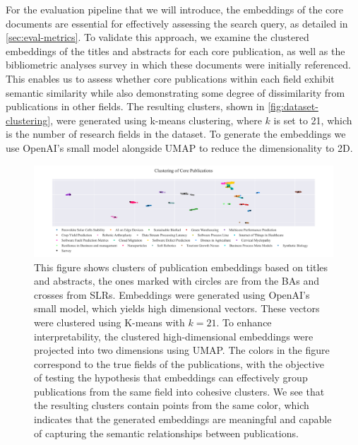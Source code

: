 For the evaluation pipeline that we will introduce, the embeddings of the core documents are essential for effectively assessing the search query, as detailed in \autoref{sec:eval-metrics}. To validate this approach, we examine the clustered embeddings of the titles and abstracts for each core publication, as well as the bibliometric analyses survey in which these documents were initially referenced. This enables us to assess whether core publications within each field exhibit semantic similarity while also demonstrating some degree of dissimilarity from publications in other fields. The resulting clusters, shown in \autoref{fig:dataset-clustering}, were generated using k-means clustering, where $k$ is set to 21, which is the number of research fields in the dataset. To generate the embeddings we use OpenAI's small model alongside UMAP \autocite{mcinnes2020umap} to reduce the dimensionality to 2D.

\begin{figure}
	\hspace*{-1.3cm}	
	\includegraphics[scale=0.45]{pics/umap_clustering.pdf}
	\caption[Core Publications Clustering]{This figure shows clusters of publication embeddings based on titles and abstracts, the ones marked with circles are from the BAs and crosses from SLRs. Embeddings were generated using OpenAI's small model, which yields high dimensional vectors. These vectors were clustered using K-means with $k=21$. To enhance interpretability, the clustered high-dimensional embeddings were projected into two dimensions using UMAP. The colors in the figure correspond to the true fields of the publications, with the objective of testing the hypothesis that embeddings can effectively group publications from the same field into cohesive clusters. We see that the resulting clusters contain points from the same color, which indicates that the generated embeddings are meaningful and capable of capturing the semantic relationships between publications.}
	\label{fig:dataset-clustering}
\end{figure}


